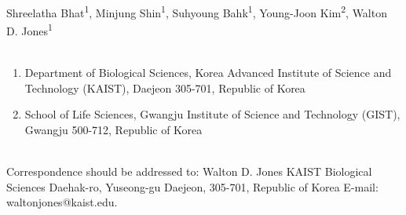 Shreelatha Bhat\textsuperscript{1}, Minjung Shin\textsuperscript{1}, Suhyoung Bahk\textsuperscript{1}, Young-Joon Kim\textsuperscript{2}, Walton D. Jones\textsuperscript{1}
\\
\\
\begin{enumerate}
\item Department of Biological Sciences, Korea Advanced Institute of Science and Technology (KAIST), Daejeon 305-701, Republic of Korea
\item School of Life Sciences, Gwangju Institute of Science and Technology (GIST), Gwangju 500-712, Republic of Korea
\end{enumerate}
\\
Correspondence should be addressed to:
\newline Walton D. Jones
\newline KAIST Biological Sciences
 Daehak-ro, Yuseong-gu
\newline Daejeon, 305-701, Republic of Korea
\newline E-mail: waltonjones@kaist.edu.